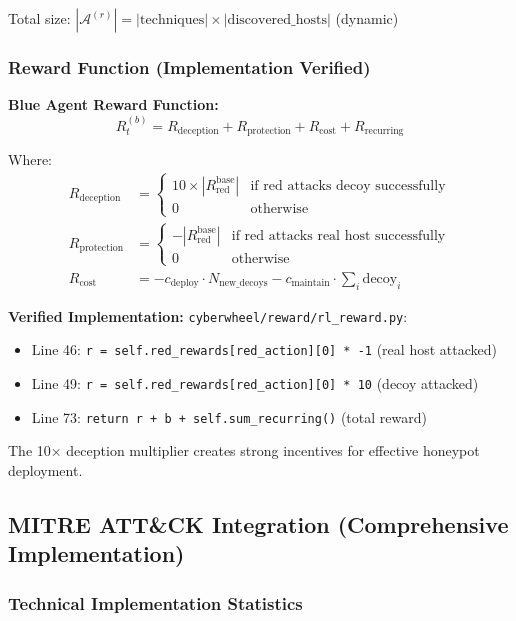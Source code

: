 \documentclass[11pt]{article}
\begin{document}
Total size: $|\mathcal{A}^{(r)}| = |\text{techniques}| \times |\text{discovered\_hosts}|$ (dynamic)

\subsubsection{Reward Function (Implementation Verified)}

\textbf{Blue Agent Reward Function:}
\begin{equation}
R_t^{(b)} = R_{\text{deception}} + R_{\text{protection}} + R_{\text{cost}} + R_{\text{recurring}}
\end{equation}

Where:
\begin{align}
R_{\text{deception}} &= \begin{cases}
10 \times |R_{\text{red}}^{\text{base}}| & \text{if red attacks decoy successfully} \\
0 & \text{otherwise}
\end{cases} \\
R_{\text{protection}} &= \begin{cases}
-|R_{\text{red}}^{\text{base}}| & \text{if red attacks real host successfully} \\
0 & \text{otherwise}
\end{cases} \\
R_{\text{cost}} &= -c_{\text{deploy}} \cdot N_{\text{new\_decoys}} - c_{\text{maintain}} \cdot \sum_{i} \text{decoy}_i
\end{align}

\textbf{Verified Implementation:} \texttt{cyberwheel/reward/rl\_reward.py}:
\begin{itemize}
\item Line 46: \texttt{r = self.red\_rewards[red\_action][0] * -1} (real host attacked)
\item Line 49: \texttt{r = self.red\_rewards[red\_action][0] * 10} (decoy attacked)
\item Line 73: \texttt{return r + b + self.sum\_recurring()} (total reward)
\end{itemize}

The 10× deception multiplier creates strong incentives for effective honeypot deployment.

\subsection{MITRE ATT\&CK Integration (Comprehensive Implementation)}

\subsubsection{Technical Implementation Statistics}
\end{document}
